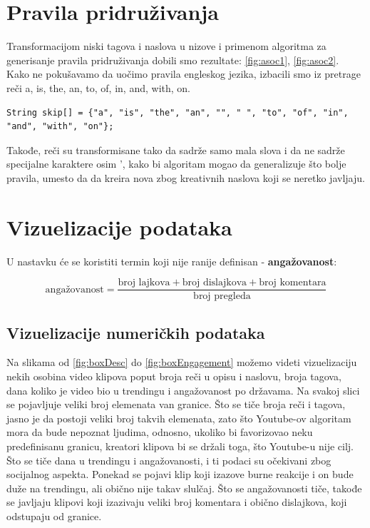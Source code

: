 \documentclass[a4paper]{article}
\theoremstyle{definition}
\begin{document}
\section{Pravila pridruživanja}
\label{sec:pravila}

Transformacijom niski tagova i naslova u nizove i primenom algoritma za generisanje pravila pridruživanja dobili smo rezultate: \ref{fig:asoc1}, \ref{fig:asoc2}.
\\
Kako ne pokušavamo da uočimo pravila engleskog jezika, izbacili smo iz pretrage reči a, is, the, an, to, of, in, and, with, on. 
\begin{lstlisting}
String skip[] = {"a", "is", "the", "an", "", " ", "to", "of", "in", "and", "with", "on"};
\end{lstlisting}
Takođe, reči su transformisane tako da sadrže samo mala slova i da ne sadrže specijalne karaktere osim ', kako bi algoritam mogao da generalizuje što bolje pravila, umesto da da kreira nova zbog kreativnih naslova koji se neretko javljaju.


\section{Vizuelizacije podataka}
\label{sec:dod}

U nastavku će se koristiti termin koji nije ranije definisan - \textbf{angažovanost}:
\newline

$$\text{angažovanost} = \frac{\text{broj lajkova} + \text{broj dislajkova} + \text{broj komentara}}{\text{broj pregleda}}$$

\subsection{Vizuelizacije numeričkih podataka}

Na slikama od \ref{fig:boxDesc} do \ref{fig:boxEngagement} možemo videti vizuelizaciju nekih osobina video klipova poput broja reči u opisu i naslovu, broja tagova, dana koliko je video bio u trendingu i angažovanost po državama. Na svakoj slici se pojavljuje veliki broj elemenata van granice. Što se tiče broja reči i tagova, jasno je da postoji veliki broj takvih elemenata, zato što Youtube-ov algoritam mora da bude nepoznat ljudima, odnosno, ukoliko bi favorizovao neku predefinisanu granicu, kreatori klipova bi se držali toga, što Youtube-u nije cilj.
\\
Što se tiče dana u trendingu i angažovanosti, i ti podaci su očekivani zbog socijalnog aspekta. Ponekad se pojavi klip koji izazove burne reakcije i on bude duže na trendingu, ali obično nije takav slulčaj. Što se angažovanosti tiče, takođe se javljaju klipovi koji izazivaju veliki broj komentara i obično dislajkova, koji odstupaju od granice.
\end{document}
